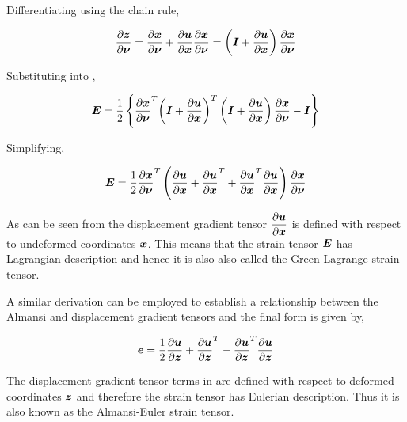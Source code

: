 \noindent Differentiating  using the chain rule,

\begin{equation}
  \delby{\vect{z}}{\vect{\nu}}=\delby{\vect{x}}{\vect{\nu}}+\delby{\vect{u}}{\vect{x}}\delby{\vect{x}}{\vect{\nu}}=
                               \pbrac{\matr{I}+\delby{\vect{u}}{\vect{x}}}\delby{\vect{x}}{\vect{\nu}}  
  \label{eqn:displacementgradient}
\end{equation}

\noindent Substituting  into ,

\begin{equation}
  \matr{E}=\frac{1}{2}\bbrac{\transpose{\delby{\vect{x}}{\vect{\nu}}}\transpose{\pbrac{\matr{I}+\delby{\vect{u}}{\vect{x}}}}
                  \pbrac{\matr{I}+\delby{\vect{u}}{\vect{x}}}\delby{\vect{x}}{\vect{\nu}}-\matr{I}}
  \label{eqn:greendisplacement1}
\end{equation}

\noindent Simplifying,

\begin{equation}
  \matr{E}=\frac{1}{2}\transpose{\delby{\vect{x}}{\vect{\nu}}}
           \pbrac{\delby{\vect{u}}{\vect{x}}+\transpose{\delby{\vect{u}}{\vect{x}}}+
	   \transpose{\delby{\vect{u}}{\vect{x}}}\delby{\vect{u}}{\vect{x}}}
	   \delby{\vect{x}}{\vect{\nu}}
  \label{eqn:greendisplacement2}
\end{equation}
 
As can be seen from  the displacement gradient
tensor $\delby{\vect{u}}{\vect{x}}$ is defined with respect to undeformed
coordinates $\vect{x}$. This means that the strain tensor $\matr{E}$ has
Lagrangian description and hence it is also also called the Green-Lagrange
strain tensor.
 
A similar derivation can be employed to establish a relationship between the
Almansi and displacement gradient tensors and the final form is given by,

\begin{equation}
  \vect{e}=\frac{1}{2}\delby{\vect{u}}{\vect{z}}+\transpose{\delby{\vect{u}}{\vect{z}}}-
	   \transpose{\delby{\vect{u}}{\vect{z}}}\delby{\vect{u}}{\vect{z}}
  \label{eqn:almansidisplacement}
\end{equation}
 
The displacement gradient tensor terms in  are defined with respect to deformed coordinates $\vect{z}$ and
therefore the strain tensor has Eulerian description. Thus it is also known as the Almansi-Euler strain tensor.

